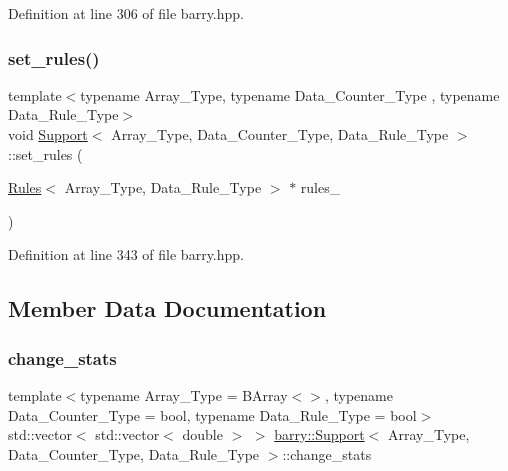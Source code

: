 Definition at line 306 of file barry.\+hpp.

\mbox{\label{classbarry_1_1_support_a66dc1a0e7097d547ea9c84df777ad477}} 
\subsubsection{\texorpdfstring{set\+\_\+rules()}{set\_rules()}}
{\footnotesize\ttfamily template$<$typename Array\+\_\+\+Type, typename Data\+\_\+\+Counter\+\_\+\+Type , typename Data\+\_\+\+Rule\+\_\+\+Type$>$ \\
void \hyperlink{classbarry_1_1_support}{Support}$<$ Array\+\_\+\+Type, Data\+\_\+\+Counter\+\_\+\+Type, Data\+\_\+\+Rule\+\_\+\+Type $>$\+::set\+\_\+rules (\begin{DoxyParamCaption}\item[{\hyperlink{classbarry_1_1_rules}{Rules}$<$ Array\+\_\+\+Type, Data\+\_\+\+Rule\+\_\+\+Type $>$ $\ast$}]{rules\+\_\+ }\end{DoxyParamCaption})\hspace{0.3cm}{\ttfamily [inline]}}



Definition at line 343 of file barry.\+hpp.



\subsection{Member Data Documentation}
\mbox{\label{classbarry_1_1_support_a37c139514065d10807cd574ca748744b}} 
\subsubsection{\texorpdfstring{change\+\_\+stats}{change\_stats}}
{\footnotesize\ttfamily template$<$typename Array\+\_\+\+Type = B\+Array$<$$>$, typename Data\+\_\+\+Counter\+\_\+\+Type = bool, typename Data\+\_\+\+Rule\+\_\+\+Type = bool$>$ \\
std\+::vector$<$ std\+::vector$<$ double $>$ $>$ \hyperlink{classbarry_1_1_support}{barry\+::\+Support}$<$ Array\+\_\+\+Type, Data\+\_\+\+Counter\+\_\+\+Type, Data\+\_\+\+Rule\+\_\+\+Type $>$\+::change\+\_\+stats}



